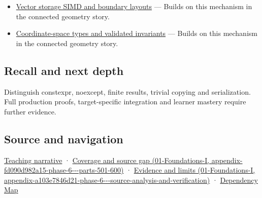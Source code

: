 \begin{itemize}
\tightlist
\item
  \hyperref[appendix-26bf6bf2fb8b]{Vector storage SIMD and boundary layouts} --- Builds on this mechanism in the connected geometry story.
\item
  \hyperref[appendix-380a220e2529]{Coordinate-space types and validated invariants} --- Builds on this mechanism in the connected geometry story.
\end{itemize}

\subsection{Recall and next depth}\label{appendix-37a39984ba66-recall-and-next-depth}

Distinguish constexpr, noexcept, finite results, trivial copying and serialization. Full production proofs, target-specific integration and learner mastery require further evidence.

\subsection{Source and navigation}\label{appendix-37a39984ba66-source-and-navigation}

\hyperref[02-foundations-ii-ch037-three-stored-numbers-are-not-the-complete-contract]{Teaching narrative} · \href{../01-Foundations-I/main.pdf\#nameddest=appendix-fd090d982a15-phase-6---parts-501-600}{Coverage and source gap (01-Foundations-I, appendix-fd090d982a15-phase-6-\/-\/-parts-501-600)} · \href{../01-Foundations-I/main.pdf\#nameddest=appendix-a103e7846d21-phase-6---source-analysis-and-verification}{Evidence and limits (01-Foundations-I, appendix-a103e7846d21-phase-6-\/-\/-source-analysis-and-verification)} · \hyperref[appendix-4ad47bdd269a]{Dependency Map}
